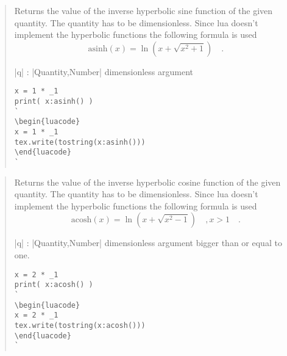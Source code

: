 \documentclass{ltxdoc}
\begin{document}
\begin{quote}
  Returns the value of the inverse hyperbolic sine function of the given quantity. The quantity has to be dimensionless. Since lua doesn't implement the hyperbolic functions the following formula is used 
  $$
    \text{asinh}(x) = \ln\left( x + \sqrt{x^2 + 1} \right)  \quad.
  $$


  \begin{description}
  \item |q| : |Quantity,Number| dimensionless argument
  \end{description}

\begin{lstlisting}
x = 1 * _1
print( x:asinh() )
`
\begin{luacode}
x = 1 * _1
tex.write(tostring(x:asinh()))
\end{luacode}
`
\end{lstlisting}

\end{quote}



\begin{quote}
  Returns the value of the inverse hyperbolic cosine function of the given quantity. The quantity has to be dimensionless. Since lua doesn't implement the hyperbolic functions the following formula is used 
  $$
    \text{acosh}(x) = \ln\left( x + \sqrt{x^2 - 1} \right)  \quad, x > 1 \quad.
  $$


  \begin{description}
  \item |q| : |Quantity,Number| dimensionless argument bigger than or equal to one.
  \end{description}

\begin{lstlisting}
x = 2 * _1
print( x:acosh() )
`
\begin{luacode}
x = 2 * _1
tex.write(tostring(x:acosh()))
\end{luacode}
`
\end{lstlisting}

\end{quote}
\end{document}
